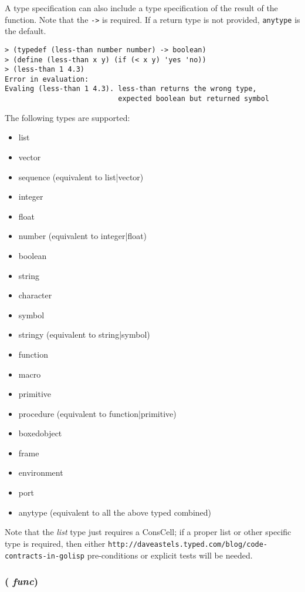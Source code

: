 \documentclass{article}
\begin{document}
A type specification can also include a type specification of the result of the function. Note
that the \verb|->| is required. If a return type is not provided, \verb|anytype| is the default.

\begin{verbatim}
> (typedef (less-than number number) -> boolean)
> (define (less-than x y) (if (< x y) 'yes 'no))
> (less-than 1 4.3)
Error in evaluation: 
Evaling (less-than 1 4.3). less-than returns the wrong type, 
                           expected boolean but returned symbol
\end{verbatim}

The following types are supported:

\begin{itemize}
\item list
\item vector
\item sequence (equivalent to list|vector)
\item integer
\item float
\item number (equivalent to integer|float)
\item boolean
\item string
\item character
\item symbol
\item stringy (equivalent to string|symbol)
\item function
\item macro
\item primitive
\item procedure (equivalent to function|primitive)
\item boxedobject
\item frame
\item environment
\item port
\item anytype (equivalent to all the above typed combined)
\end{itemize}

Note that the \emph{list} type just requires a ConsCell; if a proper list or other specific
type is required, then either \verb|http://daveastels.typed.com/blog/code-contracts-in-golisp|
pre-conditions or explicit tests will be needed.

\subsubsection{( \emph{func})}
 
\end{document}
